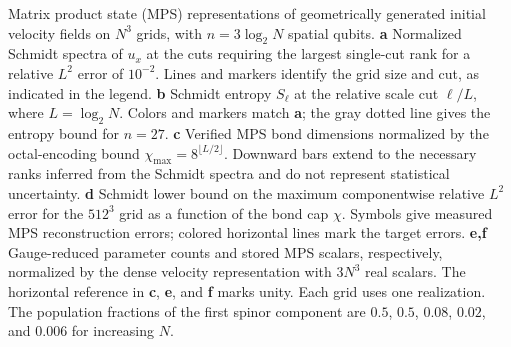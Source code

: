 \caption{Matrix product state (MPS) representations of geometrically generated initial velocity fields on $N^3$ grids, with $n=3\log_2N$ spatial qubits.
\textbf{a} Normalized Schmidt spectra of $u_x$ at the cuts requiring the largest single-cut rank for a relative $L^2$ error of $10^{-2}$. Lines and markers identify the grid size and cut, as indicated in the legend.
\textbf{b} Schmidt entropy $S_\ell$ at the relative scale cut $\ell/L$, where $L=\log_2N$. Colors and markers match \textbf{a}; the gray dotted line gives the entropy bound for $n=27$.
\textbf{c} Verified MPS bond dimensions normalized by the octal-encoding bound $\chi_{\max}=8^{\lfloor L/2\rfloor}$. Downward bars extend to the necessary ranks inferred from the Schmidt spectra and do not represent statistical uncertainty.
\textbf{d} Schmidt lower bound on the maximum componentwise relative $L^2$ error for the $512^3$ grid as a function of the bond cap $\chi$. Symbols give measured MPS reconstruction errors; colored horizontal lines mark the target errors.
\textbf{e,f} Gauge-reduced parameter counts and stored MPS scalars, respectively, normalized by the dense velocity representation with $3N^3$ real scalars. The horizontal reference in \textbf{c}, \textbf{e}, and \textbf{f} marks unity.
Each grid uses one realization. The population fractions of the first spinor component are $0.5$, $0.5$, $0.08$, $0.02$, and $0.006$ for increasing $N$.}
\label{fig:velocity_mps_resources}
